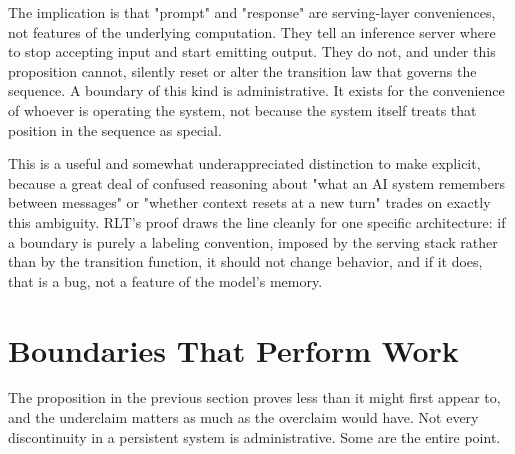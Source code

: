 \documentclass[11pt]{article}
\begin{document}
The implication is that "prompt" and "response" are serving-layer conveniences, not features of the underlying computation. They tell an inference server where to stop accepting input and start emitting output. They do not, and under this proposition cannot, silently reset or alter the transition law that governs the sequence. A boundary of this kind is administrative. It exists for the convenience of whoever is operating the system, not because the system itself treats that position in the sequence as special.

This is a useful and somewhat underappreciated distinction to make explicit, because a great deal of confused reasoning about "what an AI system remembers between messages" or "whether context resets at a new turn" trades on exactly this ambiguity. RLT's proof draws the line cleanly for one specific architecture: if a boundary is purely a labeling convention, imposed by the serving stack rather than by the transition function, it should not change behavior, and if it does, that is a bug, not a feature of the model's memory.

\section{Boundaries That Perform Work}

The proposition in the previous section proves less than it might first appear to, and the underclaim matters as much as the overclaim would have. Not every discontinuity in a persistent system is administrative. Some are the entire point.
\end{document}
